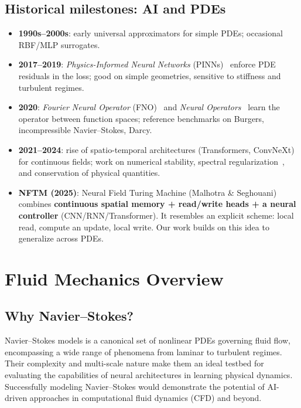\subsection{Historical milestones: AI and PDEs}
\begin{itemize}
	\item \textbf{1990s--2000s}: early universal approximators for simple PDEs; occasional RBF/MLP surrogates.
	\item \textbf{2017--2019}: \textit{Physics-Informed Neural Networks} (PINNs)~\cite{raissi2019physics} enforce PDE residuals in the loss; good on simple geometries, sensitive to stiffness and turbulent regimes.
	\item \textbf{2020}: \textit{Fourier Neural Operator} (FNO)~\cite{li2021fourier} and \textit{Neural Operators}~\cite{kovachki2023neural} learn the operator between function spaces; reference benchmarks on Burgers, incompressible Navier--Stokes, Darcy.
	\item \textbf{2021--2024}: rise of spatio-temporal architectures (Transformers, ConvNeXt) for continuous fields; work on numerical stability, spectral regularization~\cite{rahaman2019spectral}, and conservation of physical quantities.
	\item \textbf{NFTM (2025)}: Neural Field Turing Machine (Malhotra \& Seghouani) \cite{malhotra2025neuralfieldturingmachine} combines \textbf{continuous spatial memory + read/write heads + a neural controller} (CNN/RNN/Transformer). It resembles an explicit scheme: local read, compute an update, local write. Our work builds on this idea to generalize across PDEs.
\end{itemize}

\section{Fluid Mechanics Overview}

\subsection{Why Navier--Stokes?}
	Navier--Stokes models is a canonical set of nonlinear PDEs governing fluid flow, encompassing a wide range of phenomena from laminar to turbulent regimes. Their complexity and multi-scale nature make them an ideal testbed for evaluating the capabilities of neural architectures in learning physical dynamics. Successfully modeling Navier--Stokes would demonstrate the potential of AI-driven approaches in computational fluid dynamics (CFD) and beyond.

